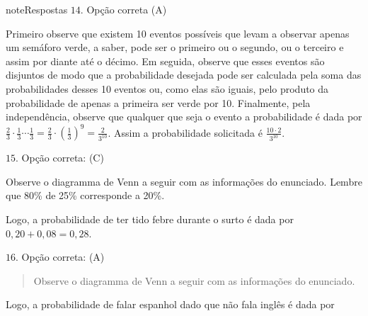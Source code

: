 \begin{sphinxadmonition}{note}{Respostas}
\(14.\) Opção correta (A)

Primeiro observe que existem 10 eventos possíveis que levam a observar apenas um semáforo verde, a saber, pode ser o primeiro ou o segundo, ou o terceiro e assim por diante até o décimo. Em seguida, observe que esses eventos são disjuntos de modo que a probabilidade desejada pode ser calculada pela soma das probabilidades desses 10 eventos ou, como elas são iguais, pelo produto da probabilidade de apenas a primeira ser verde por 10. Finalmente, pela independência, observe que qualquer que seja o evento a probabilidade é dada por \(\frac{2}{3}\cdot \frac{1}{3} \cdots \frac{1}{3}=\frac{2}{3}\cdot \left (\frac{1}{3}\right )^9=\frac{2}{3^{10}}\). Assim a probabilidade solicitada é \(\frac{10\cdot 2}{3^{10}}\).

\(15.\) Opção correta: (C)

Observe o diagramma de Venn a seguir com as informações do enunciado. Lembre que 80\% de 25\% corresponde a 20\%.
\begin{center}\end{center}
Logo, a probabilidade de ter tido febre durante o surto é dada por \(0,20+0,08=0,28\).

\(16.\) Opção correta: (A)
\begin{quote}

Observe o diagramma de Venn a seguir com as informações do enunciado.
\end{quote}
\begin{center}\end{center}
Logo, a probabilidade de falar espanhol dado que não fala inglês é dada por


\end{sphinxadmonition}
